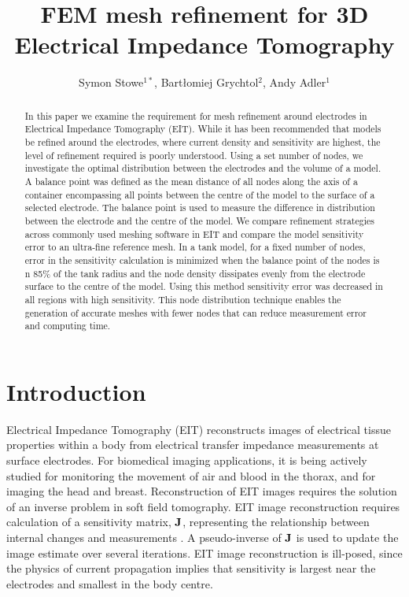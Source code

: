 \documentclass[12pt]{iopart}
\newcommand{\COMMENT}[1]{ \textsf{\color{blue}{{COMMENT: #1}}} }
\begin{document}
\title{%
FEM mesh refinement for 3D Electrical Impedance Tomography %
}

 \author{%
Symon Stowe$^{1*}$,
Bart\l{}omiej Grychtol$^2$,
Andy Adler$^1$}

\address{
$^1$~Systems and Computer Engineering, Carleton University, Ottawa, Canada
$^2$~\COMMENT{TODO: Fill this in}
}
\vspace{10pt}

\begin{abstract}
In this paper we examine the requirement for mesh refinement around 
electrodes in Electrical Impedance Tomography (EIT). 
While it has been recommended that  models be refined around the electrodes, where current
density and sensitivity are highest,  the level of refinement required is poorly understood. 
Using a set number of nodes, we investigate the optimal distribution 
between the electrodes and 
the volume of a model. A balance point was defined as the mean distance of all nodes along the axis 
of a container encompassing all points between the centre of the model to the surface of a selected electrode.
The balance point is used to measure the difference in distribution between the electrode and the centre of
the model.
We compare refinement strategies across commonly used meshing software in EIT and compare the 
model sensitivity error to an ultra-fine reference mesh. 
In a tank model, for a fixed number of nodes, error in the sensitivity calculation is minimized 
when the balance point of the nodes is n  85\% of the tank radius and the node density dissipates evenly 
from the electrode surface to the centre of the model. Using this method sensitivity error was decreased 
in all regions with high sensitivity. This node distribution technique  enables the generation  of accurate 
meshes with fewer nodes that can reduce measurement error and computing time. 

\end{abstract}

\section{Introduction}
Electrical Impedance Tomography (EIT) reconstructs images of 
electrical tissue properties within a body from electrical
transfer impedance measurements at surface electrodes. For
biomedical imaging applications, it is being actively studied
for monitoring
the movement of air and blood in the thorax, and for imaging
the head and breast. Reconstruction of EIT images requires
the solution of an inverse problem in soft field tomography.
EIT image reconstruction requires 
calculation of a sensitivity matrix, $\bf J$, representing the relationship between internal changes and measurements
 . A pseudo-inverse of $\bf J$ is used
to update the image estimate over several iterations. 
EIT image reconstruction is ill-posed, since the physics of
current propagation implies that sensitivity is largest near
the electrodes and smallest in the body centre.
\end{document}
